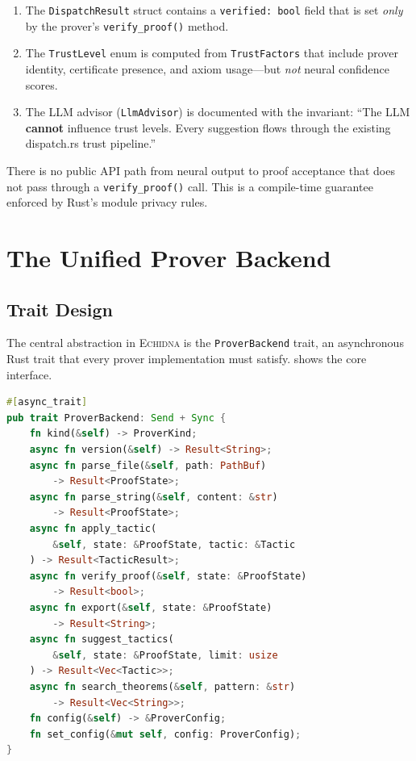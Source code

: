 \documentclass[11pt,a4paper]{article}
\newcommand{\echidna}{\textsc{Echidna}}
\newcommand{\proverbackend}{\texttt{ProverBackend}}
\begin{document}
\begin{enumerate}
  \item The \texttt{DispatchResult} struct contains a \texttt{verified: bool}
  field that is set \emph{only} by the prover's \texttt{verify\_proof()} method.
  \item The \texttt{TrustLevel} enum is computed from \texttt{TrustFactors}
  that include prover identity, certificate presence, and axiom usage---but
  \emph{not} neural confidence scores.
  \item The LLM advisor (\texttt{LlmAdvisor}) is documented with the invariant:
  ``The LLM \textbf{cannot} influence trust levels. Every suggestion flows
  through the existing dispatch.rs trust pipeline.''
\end{enumerate}

There is no public API path from neural output to proof acceptance that does
not pass through a \texttt{verify\_proof()} call. This is a compile-time
guarantee enforced by Rust's module privacy rules.


\section{The Unified Prover Backend}
\label{sec:unified-backend}

\subsection{Trait Design}

The central abstraction in \echidna{} is the \proverbackend{} trait, an
asynchronous Rust trait that every prover implementation must satisfy.
 shows the core interface.

\begin{lstlisting}[language=Rust,caption={The \proverbackend{} trait (simplified).},label=lst:trait]
#[async_trait]
pub trait ProverBackend: Send + Sync {
    fn kind(&self) -> ProverKind;
    async fn version(&self) -> Result<String>;
    async fn parse_file(&self, path: PathBuf)
        -> Result<ProofState>;
    async fn parse_string(&self, content: &str)
        -> Result<ProofState>;
    async fn apply_tactic(
        &self, state: &ProofState, tactic: &Tactic
    ) -> Result<TacticResult>;
    async fn verify_proof(&self, state: &ProofState)
        -> Result<bool>;
    async fn export(&self, state: &ProofState)
        -> Result<String>;
    async fn suggest_tactics(
        &self, state: &ProofState, limit: usize
    ) -> Result<Vec<Tactic>>;
    async fn search_theorems(&self, pattern: &str)
        -> Result<Vec<String>>;
    fn config(&self) -> &ProverConfig;
    fn set_config(&mut self, config: ProverConfig);
}
\end{lstlisting}
\end{document}
